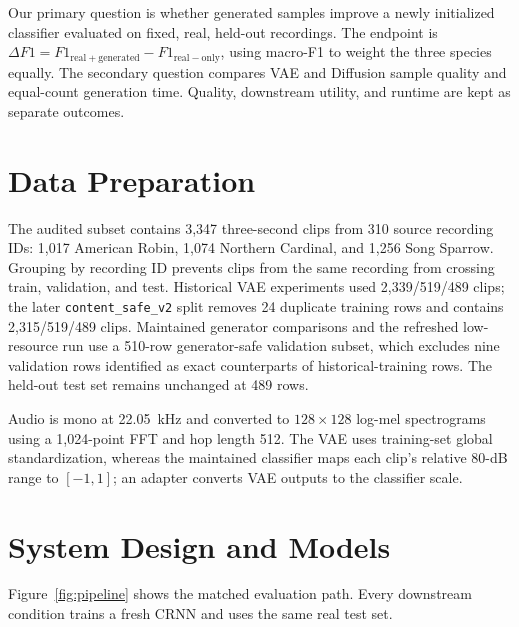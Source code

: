 \documentclass{article}
\begin{document}
Our primary question is whether generated samples improve a newly initialized
classifier evaluated on fixed, real, held-out recordings. The endpoint is
$\Delta F1=F1_{\mathrm{real+generated}}-F1_{\mathrm{real-only}}$, using
macro-F1 to weight the three species equally. The secondary question compares
VAE and Diffusion sample quality and equal-count generation time. Quality,
downstream utility, and runtime are kept as separate outcomes.

\section{Data Preparation}

The audited subset contains 3,347 three-second clips from 310 source recording
IDs: 1,017 American Robin, 1,074 Northern Cardinal, and 1,256 Song Sparrow.
Grouping by recording ID prevents clips from the same recording from crossing
train, validation, and test. Historical VAE experiments used 2,339/519/489
clips; the later \texttt{content\_safe\_v2} split removes 24 duplicate training
rows and contains 2,315/519/489 clips. Maintained generator comparisons and the
refreshed low-resource run use a 510-row generator-safe validation subset,
which excludes nine validation rows identified as exact counterparts of
historical-training rows. The held-out test set remains unchanged at 489 rows.

Audio is mono at 22.05~kHz and converted to $128\times128$ log-mel
spectrograms using a 1,024-point FFT and hop length 512. The VAE uses
training-set global standardization, whereas the maintained classifier maps
each clip's relative 80-dB range to $[-1,1]$; an adapter converts VAE outputs
to the classifier scale.

\section{System Design and Models}

Figure~\ref{fig:pipeline} shows the matched evaluation path. Every downstream
condition trains a fresh CRNN and uses the same real test set.
\end{document}
